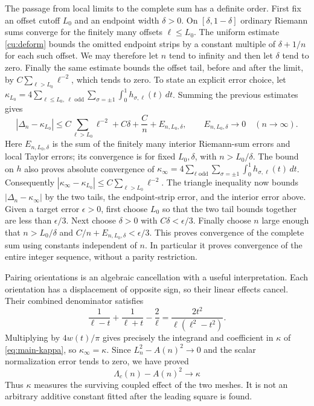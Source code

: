The passage from local limits to the complete sum has a definite
order. First fix an offset cutoff $L_0$ and an endpoint width
$\delta>0$. On $[\delta,1-\delta]$ ordinary Riemann sums converge
for the finitely many offsets $\ell\leq L_0$. The uniform estimate
\eqref{cu:deform} bounds the omitted endpoint strips by a constant
multiple of $\delta+1/n$ for each such offset. We may therefore
let $n$ tend to infinity and then let $\delta$ tend to zero.
Finally the same estimate bounds the offset tail, before and after
the limit, by $C\sum_{\ell>L_0}\ell^{-2}$, which tends to zero.
To state an explicit error choice, let
$\kappa_{L_0}=4\sum_{\ell\leq L_0,\ \ell\text{ odd}}
\sum_{\sigma=\pm1}\int_0^1h_{\sigma,\ell}(t)\,dt$.
Summing the previous estimates gives
\[
 |\Delta_n-\kappa_{L_0}|
 \leq C\sum_{\ell>L_0}\ell^{-2}
       +C\delta+\frac Cn+E_{n,L_0,\delta},
 \qquad E_{n,L_0,\delta}\longrightarrow0\quad(n\to\infty).
\]
Here $E_{n,L_0,\delta}$ is the sum of the finitely many interior
Riemann-sum errors and local Taylor errors; its convergence is for
fixed $L_0,\delta$, with $n>L_0/\delta$. The bound on $h$ also proves absolute convergence of
$\kappa_\infty=4\sum_{\ell\text{ odd}}\sum_{\sigma=\pm1}\int_0^1h_{\sigma,\ell}(t)\,dt$.
Consequently $|\kappa_\infty-\kappa_{L_0}|\leq C\sum_{\ell>L_0}\ell^{-2}$.
The triangle inequality now bounds $|\Delta_n-\kappa_\infty|$ by the two
tails, the endpoint-strip error, and the interior error above. Given a target
error $\epsilon>0$, first choose $L_0$ so that the two tail bounds
together are less than $\epsilon/3$. Next choose $\delta>0$
with $C\delta<\epsilon/3$. Finally choose $n$ large enough
that $n>L_0/\delta$ and $C/n+E_{n,L_0,\delta}<\epsilon/3$.
This proves convergence of the complete sum using constants
independent of $n$. In particular it proves convergence of the
entire integer sequence, without a parity restriction.

Pairing orientations is an algebraic cancellation with a useful
interpretation. Each orientation has a displacement of opposite sign,
so their linear effects cancel. Their combined denominator satisfies
\[
 \frac1{\ell-t}+\frac1{\ell+t}-\frac2\ell
 =\frac{2t^2}{\ell(\ell^2-t^2)}.
\]
Multiplying by $4w(t)/\pi$ gives precisely the integrand and
coefficient in $\kappa$ of \eqref{eq:main-kappa}, so
$\kappa_\infty=\kappa$. Since $L_n^2-A(n)^2\to0$ and the scalar
normalization error tends to zero, we have proved
\begin{equation}\label{cu:kappa}
 \Lambda_c(n)-A(n)^2\longrightarrow\kappa
\end{equation}
Thus $\kappa$ measures the surviving
coupled effect of the two meshes. It is not an arbitrary additive
constant fitted after the leading square is found.

